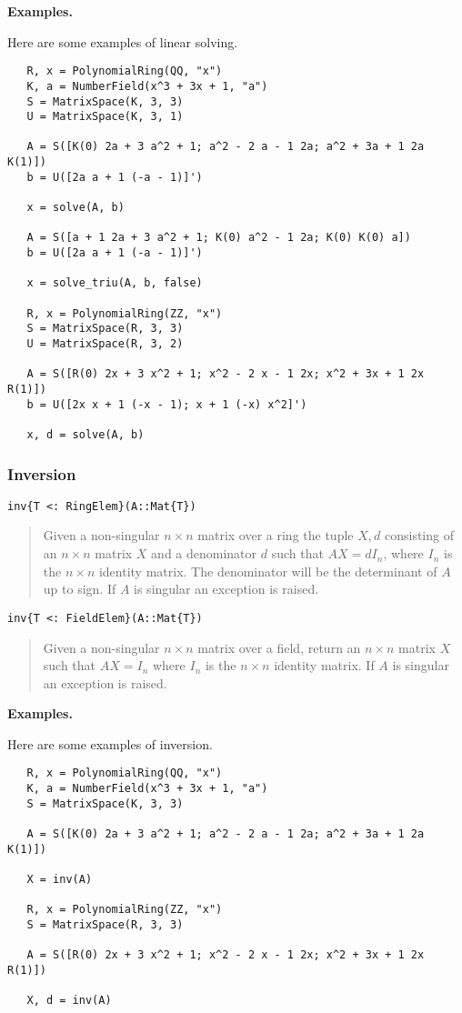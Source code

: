 \documentclass[a4paper,10pt]{article}
\newcommand{\desc}[1]{\vspace{-3mm}\begin{quote}#1\end{quote}}
\begin{document}
\textbf{Examples.}

Here are some examples of linear solving.

\begin{lstlisting}
   R, x = PolynomialRing(QQ, "x")
   K, a = NumberField(x^3 + 3x + 1, "a")
   S = MatrixSpace(K, 3, 3)
   U = MatrixSpace(K, 3, 1)

   A = S([K(0) 2a + 3 a^2 + 1; a^2 - 2 a - 1 2a; a^2 + 3a + 1 2a K(1)])
   b = U([2a a + 1 (-a - 1)]')

   x = solve(A, b)

   A = S([a + 1 2a + 3 a^2 + 1; K(0) a^2 - 1 2a; K(0) K(0) a])
   b = U([2a a + 1 (-a - 1)]')

   x = solve_triu(A, b, false)

   R, x = PolynomialRing(ZZ, "x")
   S = MatrixSpace(R, 3, 3)
   U = MatrixSpace(R, 3, 2)

   A = S([R(0) 2x + 3 x^2 + 1; x^2 - 2 x - 1 2x; x^2 + 3x + 1 2x R(1)])
   b = U([2x x + 1 (-x - 1); x + 1 (-x) x^2]')

   x, d = solve(A, b)
\end{lstlisting}

\subsubsection{Inversion}

\begin{lstlisting}
inv{T <: RingElem}(A::Mat{T})
\end{lstlisting}

\desc{Given a non-singular $n\times n$ matrix over a ring the tuple $X, d$
consisting of an $n\times n$ matrix $X$ and a denominator $d$ such that
$AX = dI_n$, where $I_n$ is the $n\times n$ identity matrix. The denominator
will be the determinant of $A$ up to sign. If $A$ is singular an exception 
is raised.}

\begin{lstlisting}
inv{T <: FieldElem}(A::Mat{T})
\end{lstlisting}

\desc{Given a non-singular $n\times n$ matrix over a field, return an
$n\times n$ matrix $X$ such that $AX = I_n$ where $I_n$ is the $n\times n$
identity matrix. If $A$ is singular an exception is raised.}

\textbf{Examples.}

Here are some examples of inversion.

\begin{lstlisting}
   R, x = PolynomialRing(QQ, "x")
   K, a = NumberField(x^3 + 3x + 1, "a")
   S = MatrixSpace(K, 3, 3)

   A = S([K(0) 2a + 3 a^2 + 1; a^2 - 2 a - 1 2a; a^2 + 3a + 1 2a K(1)])

   X = inv(A)

   R, x = PolynomialRing(ZZ, "x")
   S = MatrixSpace(R, 3, 3)

   A = S([R(0) 2x + 3 x^2 + 1; x^2 - 2 x - 1 2x; x^2 + 3x + 1 2x R(1)])
    
   X, d = inv(A)
\end{lstlisting}
\end{document}
